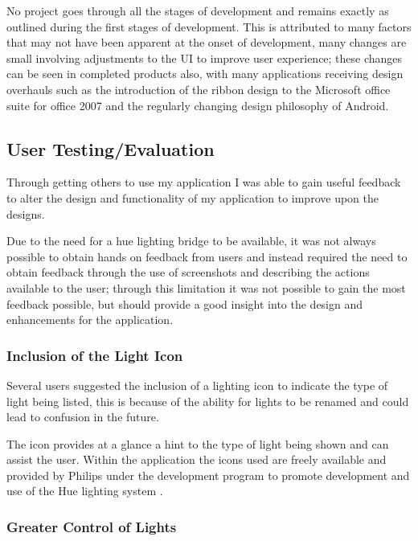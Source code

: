 No project goes through all the stages of development and remains
exactly as outlined during the first stages of development. This is
attributed to many factors that may not have been apparent at the onset
of development, many changes are small involving adjustments to the UI
to improve user experience; these changes can be seen in completed
products also, with many applications receiving design overhauls such as
the introduction of the ribbon design to the Microsoft office suite for
office 2007 \parencite{officeribbon} and the regularly changing design
philosophy of Android.

\subsection{User Testing/Evaluation}\label{user-testingevaluation}

Through getting others to use my application I was able to gain useful
feedback to alter the design and functionality of my application to
improve upon the designs.

Due to the need for a hue lighting bridge to be available, it was not
always possible to obtain hands on feedback from users and instead
required the need to obtain feedback through the use of screenshots and
describing the actions available to the user; through this limitation it
was not possible to gain the most feedback possible, but should provide
a good insight into the design and enhancements for the application.

\subsubsection{Inclusion of the Light
Icon}\label{inclusion-of-the-light-icon}

Several users suggested the inclusion of a lighting icon to indicate the
type of light being listed, this is because of the ability for lights to
be renamed and could lead to confusion in the future.

The icon provides at a glance a hint to the type of light being shown
and can assist the user. Within the application the icons used are
freely available and provided by Philips under the development program
to promote development and use of the Hue lighting system
\parencite{hueicons}.

\subsubsection{Greater Control of
Lights}\label{greater-control-of-lights}

